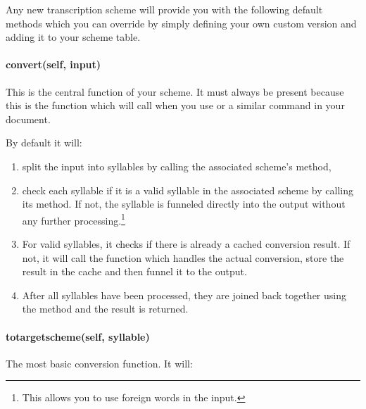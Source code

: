 \documentclass{ltxdockit}
\begin{document}

Any new transcription scheme will provide you with the following default methods
which you can override by simply defining your own custom version and adding it
to your scheme table.

\paragraph{convert(self, input)}

This is the central function of your scheme. It must always be present because
this is the function which \transconv{} will call when you use
 or a similar command in your document.

By default it will:

\begin{enumerate}
  \item split the input into syllables by calling the associated 
    scheme's  method,
  \item check each syllable if it is a valid syllable in the associated
     scheme by calling its
     method. If not, the
    syllable is funneled directly into the output without any further
    processing.\footnote{This allows you to use foreign words in the input.}
  \item For valid syllables, it checks if there is already a cached conversion
    result. If not, it will call the
     function which
    handles the actual conversion, store the result in the cache and then funnel
    it to the output.
  \item After all syllables have been processed, they are joined back together
    using the  method and the result is returned.
\end{enumerate}

\paragraph{to\textunderscore{}target\textunderscore{}scheme(self, syllable)}

The most basic conversion function. It will:
\end{document}

